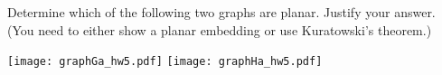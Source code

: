 
\begin{problem}
Determine which of the following two graphs are planar.
Justify your answer. (You need to either show a planar embedding or
use Kuratowski's theorem.)

	\begin{center}
		\texttt{[image: graphGa\_hw5.pdf]}
		\hfill
		\texttt{[image: graphHa\_hw5.pdf]}
	\end{center}

\end{problem}




